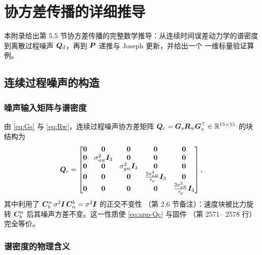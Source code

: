 \section{协方差传播的详细推导}
\label{app:covariance}

本附录给出第 5.5 节协方差传播的完整数学推导：从连续时间误差动力学的谱密度
到离散过程噪声 $\boldsymbol{Q}_d$，再到 $\boldsymbol{P}$ 递推与 Joseph 更新，并给出一个
一维标量验证算例。

\subsection{连续过程噪声的构造}

\subsubsection{噪声输入矩阵与谱密度}

由 \cref{eq:Gs} 与 \cref{eq:Rw}，连续过程噪声协方差矩阵
$\boldsymbol{Q}_c = \boldsymbol{G}_s\boldsymbol{R}_w\boldsymbol{G}_s^{\top} \in \mathbb{R}^{15\times15}$ 的块结构为
\begin{equation}
  \boldsymbol{Q}_c = \begin{bmatrix}
    \boldsymbol{0} & \boldsymbol{0} & \boldsymbol{0} & \boldsymbol{0} & \boldsymbol{0} \\
    \boldsymbol{0} & \sigma_{aw}^2\boldsymbol{I}_3 & \boldsymbol{0} & \boldsymbol{0} & \boldsymbol{0} \\
    \boldsymbol{0} & \boldsymbol{0} & \sigma_{gw}^2\boldsymbol{I}_3 & \boldsymbol{0} & \boldsymbol{0} \\
    \boldsymbol{0} & \boldsymbol{0} & \boldsymbol{0} & \frac{2\sigma_{aB}^2}{\tau_a}\boldsymbol{I}_3 & \boldsymbol{0} \\
    \boldsymbol{0} & \boldsymbol{0} & \boldsymbol{0} & \boldsymbol{0} & \frac{2\sigma_{gB}^2}{\tau_g}\boldsymbol{I}_3
  \end{bmatrix},
  \label{eq:app-Qc}
\end{equation}
其中利用了 $\boldsymbol{C}_b^n\,\sigma^2\boldsymbol{I}\,\boldsymbol{C}_n^b = \sigma^2\boldsymbol{I}$ 的正交不变性
（第 2.6 节备注）：速度块被比力旋转 $\boldsymbol{C}_b^n$ 后其噪声方差不变。这一性质使
\cref{eq:app-Qc} 与固件 （第 2571--
2578 行）完全等价。

\subsubsection{谱密度的物理含义}

